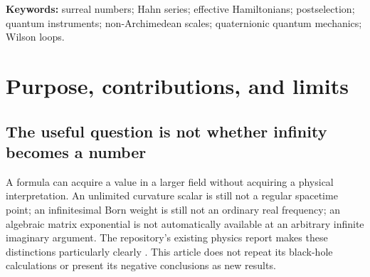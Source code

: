 \documentclass[11pt,oneside]{article}
\numberwithin{equation}{section}
\theoremstyle{plain}
\theoremstyle{definition}
\theoremstyle{remark}
\newcommand{\R}{\mathbb R}
\newcommand{\HH}{\mathbb H}
\begin{document}
\begin{abstract}
We investigate a conservative role for surreal, surcomplex, and surquaternion numbers in theoretical physics: not a replacement for dynamics or measurement theory, but an exact coefficient language for separated scales. We work in a set-sized real-closed Hahn field $K=\R((t^G))$, its complexification $F=K(i)$, and the quaternion division algebra $\HH(K)$, with $G$ an arbitrary divisible ordered abelian group. Five results organize the investigation. First, an initial-form theorem computes the ordinary conditional state of any nonzero finite Kraus branch, even when its probability is infinitesimal. Second, a sharp success-weighted trace-distance inequality limits the operational amplification of such events, while an explicit rank-two example shows that all power-order data in one parameter can fail to determine a conditioned state. Third, an exact invariant-graph theorem eliminates a collection of unlimited-energy sectors with independently separated scales and gives a finite effective Hamiltonian, a uniform second-order correction, and a positive unlimited complementary spectrum. A three-level example proves that virtual transitions can dominate a direct bias smaller than every power of the coupling. Fourth, quaternionic complexification transports finite surquaternion instruments to ordinary complex shadows, while a dimension argument rules out a naive quaternionic composite with independent local preparations and measurements. Fifth, initial quaternionic curvature determines the valuation and leading coefficient of a positive Wilson-loop action, without cancellation. We also reprove the algebraic Bell bound in this setting. Established ingredients are explicitly distinguished from the proposed extensions; applications are mathematical model applications rather than claims of empirically new physics.
\end{abstract}

\noindent\textbf{Keywords:} surreal numbers; Hahn series; effective Hamiltonians; postselection; quantum instruments; non-Archimedean scales; quaternionic quantum mechanics; Wilson loops.

\tableofcontents
\newpage

\section{Purpose, contributions, and limits}\label{sec:intro}

\subsection{The useful question is not whether infinity becomes a number}
A formula can acquire a value in a larger field without acquiring a physical interpretation. An unlimited curvature scalar is still not a regular spacetime point; an infinitesimal Born weight is still not an ordinary real frequency; an algebraic matrix exponential is not automatically available at an arbitrary infinite imaginary argument. The repository's existing physics report makes these distinctions particularly clearly \cite{repoPhysics}. This article does not repeat its black-hole calculations or present its negative conclusions as new results.
\end{document}
